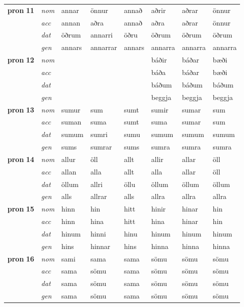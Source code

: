 \begin{longtable}[l]{l>{\footnotesize\itshape}lllllll}
\multirow{3}{*}{{{\textbf{pron} \Large{\textbf{11}}}}}  & nom & annar & önnur    & annað & aðrir & aðrar & önnur \\*
  & acc &  annan  & aðra   & annað & aðra & aðrar & önnur \\*
&  dat & öðrum & annarri   & öðru & öðrum & öðrum & öðrum \\*
  & gen & annars  & annarrar  & annars & annarra & annarra & annarra\\
\cmidrule{1-8}

\multirow{3}{*}{{{\textbf{pron} \Large{\textbf{12}}}}}  & nom &  &     &  & báðir & báðar & bæði \\*
  & acc &    &    &  & báða & báðar & bæði \\*
&  dat &  &    &  & báðum & báðum & báðum \\*
  & gen &   &   &  & beggja & beggja & beggja\\
\cmidrule{1-8}

\multirow{3}{*}{{{\textbf{pron} \Large{\textbf{13}}}}}  & nom & sumur & sum    & sumt & sumir & sumar & sum \\*
  & acc &  suman  & suma   & sumt & suma & sumar & sum \\*
&  dat & sumum & sumri   & sumu & sumum & sumum & sumum \\*
  & gen & sums  & sumrar  & sums & sumra & sumra & sumra\\
\cmidrule{1-8}

\multirow{3}{*}{{{\textbf{pron} \Large{\textbf{14}}}}}  & nom & allur & öll    & allt & allir & allar & öll \\*
  & acc &  allan  & alla   & allt & alla & allar & öll \\*
&  dat & öllum & allri   & öllu & öllum & öllum & öllum \\*
  & gen & alls  & allrar  & alls & allra & allra & allra\\
\cmidrule{1-8}

\multirow{3}{*}{{{\textbf{pron} \Large{\textbf{15}}}}}  & nom & hinn & hin    & hitt & hinir & hinar & hin \\*
  & acc &  hinn  & hina   & hitt & hina & hinar & hin \\*
&  dat & hinum & hinni   & hinu & hinum & hinum & hinum \\*
  & gen & hins  & hinnar  & hins & hinna & hinna & hinna\\
\cmidrule{1-8}

\multirow{3}{*}{{{\textbf{pron} \Large{\textbf{16}}}}}  & nom & sami & sama    & sama & sömu & sömu & sömu \\*
  & acc &  sama  & sömu   & sama & sömu & sömu & sömu \\*
&  dat & sama & sömu   & sama & sömu & sömu & sömu \\*
  & gen & sama  & sömu  & sama & sömu & sömu & sömu\\

\bottomrule
\end{longtable}
